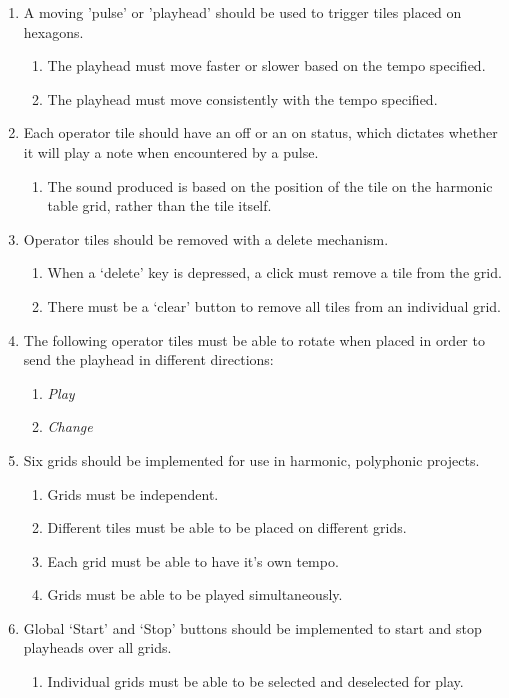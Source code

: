 \documentclass[10pt,a4paper]{article}
\begin{document}
\begin{enumerate}
\item A moving 'pulse' or 'playhead' should be used to trigger tiles placed on hexagons.
\begin{enumerate}
\item The playhead must move faster or slower based on the tempo specified.
\item The playhead must move consistently with the tempo specified.
\end{enumerate}

\item Each operator tile should have an off or an on status, which dictates whether it will play a note when encountered by a pulse.
\begin{enumerate}
\item The sound produced is based on the position of the tile on the harmonic table grid, rather than the tile itself.
\end{enumerate}

\item Operator tiles should be removed with a delete mechanism.
\begin{enumerate}
\item When a `delete' key is depressed, a click must remove a tile from the grid.
\item There must be a `clear' button to remove all tiles from an individual grid.
\end{enumerate}

\item The following operator tiles must be able to rotate when placed in order to send the playhead in different directions:
\begin{enumerate}
\item \textit{Play}
\item \textit{Change}
\end{enumerate}

\item Six grids should be implemented for use in harmonic, polyphonic projects.
\begin{enumerate}
\item Grids must be independent.
\item Different tiles must be able to be placed on different grids.
\item Each grid must be able to have it's own tempo.
\item Grids must be able to be played simultaneously.
\end{enumerate}

\item Global `Start' and `Stop' buttons should be implemented to start and stop playheads over all grids.
\begin{enumerate}
\item Individual grids must be able to be selected and deselected for play.
\end{enumerate}


\end{enumerate}
\end{document}
